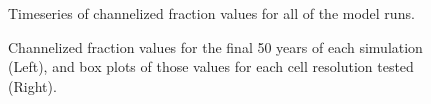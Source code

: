 \begin{figure}[!ht]
	\caption{Timeseries of channelized fraction values for all of the model runs.}
	\label{fig:res_chanfrac_timeseries}
\end{figure}

\begin{figure}[!ht]
	\caption{Channelized fraction values for the final 50 years of each simulation (Left), and box plots of those values for each cell resolution tested (Right).}
	\label{fig:res_chanfrac}
\end{figure}

